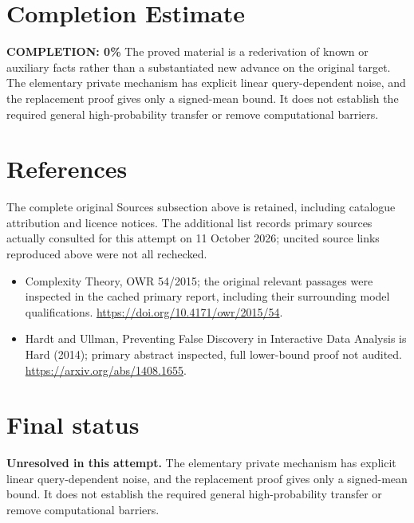 \documentclass[11pt]{article}
\begin{document}
\section{Completion Estimate}
\noindent\textbf{COMPLETION: 0\%}
The proved material is a rederivation of known or auxiliary facts rather than a substantiated new advance on the original target. The elementary private mechanism has explicit linear query-dependent noise, and the replacement proof gives only a signed-mean bound. It does not establish the required general high-probability transfer or remove computational barriers.
\section{References}
The complete original Sources subsection above is retained, including catalogue attribution and licence notices. The additional list records primary sources actually consulted for this attempt on 11 October 2026; uncited source links reproduced above were not all rechecked.
\begin{itemize}
\item Complexity Theory, OWR 54/2015; the original relevant passages were inspected in the cached primary report, including their surrounding model qualifications. \url{https://doi.org/10.4171/owr/2015/54}.
\item Hardt and Ullman, Preventing False Discovery in Interactive Data Analysis is Hard (2014); primary abstract inspected, full lower-bound proof not audited. \url{https://arxiv.org/abs/1408.1655}.
\end{itemize}
\section{Final status}
\textbf{Unresolved in this attempt.} The elementary private mechanism has explicit linear query-dependent noise, and the replacement proof gives only a signed-mean bound. It does not establish the required general high-probability transfer or remove computational barriers.
\end{document}
